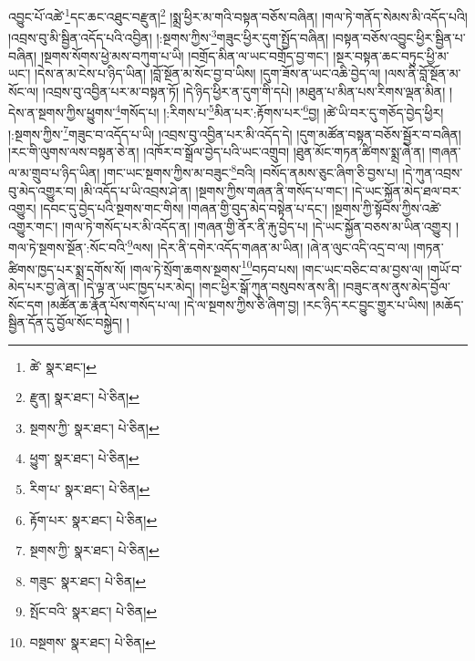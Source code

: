 འབྱུང་པོ་འཚེ་\footnote{ཚེ་  སྣར་ཐང་། }དང་ཆང་འཐུང་བརྫུན།\footnote{རྫུན།  སྣར་ཐང་།  པེ་ཅིན། } །སྨྲ་ཕྱིར་མ་གའི་བསྟན་བཅོས་བཞིན། །གལ་ཏེ་གནོད་སེམས་མི་འདོད་པའི། །འབྲས་བུ་མི་སྦྱིན་འདོད་པའི་འབྱིན། །:སྔགས་ཀྱིས་\footnote{སྔགས་ཀྱི་  སྣར་ཐང་།  པེ་ཅིན། }གཟུང་ཕྱིར་དུག་སྤྱོད་བཞིན། །བསྟན་བཅོས་འབྱུང་ཕྱིར་སྦྱིན་པ་བཞིན། །སྔགས་སོགས་ཕྱེ་མས་བཀུག་པ་ཡི། །བགྲོད་མིན་ལ་ཡང་བགྲོད་བྱ་གང་། །སྔར་བསྟན་ཆང་བཏུང་ཕྱི་མ་ཡང་། །དེས་ན་མ་ངེས་པ་ཉིད་ཡིན། །བློ་སྔོན་མ་སོང་བྱ་བ་ཡིས། །དུག་ཟོས་ན་ཡང་འཆི་བྱེད་ལ། །ལས་ནི་བློ་སྔོན་མ་སོང་ལ། །འབྲས་བུ་འབྱིན་པར་མ་བསྟན་ཏོ། །དེ་ཉིད་ཕྱིར་ན་དུག་གི་དཔེ། །མཐུན་པ་མིན་པས་རིགས་ལྡན་མིན། །དེས་ན་སྔགས་ཀྱིས་ཕྱུགས་\footnote{ཕྱུག་  སྣར་ཐང་།  པེ་ཅིན། }གསོད་པ། །:རིགས་པ་\footnote{རིག་པ་  སྣར་ཐང་།  པེ་ཅིན། }མིན་པར་:རྟོགས་པར་\footnote{རྟོག་པར་  སྣར་ཐང་།  པེ་ཅིན། }བྱ། །ཚེ་ཡི་བར་དུ་གཅོད་བྱེད་ཕྱིར། །:སྔགས་ཀྱིས་\footnote{སྔགས་ཀྱི་  སྣར་ཐང་།  པེ་ཅིན། }གཟུང་བ་འདོད་པ་ཡི། །འབྲས་བུ་འབྱིན་པར་མི་འདོད་དེ། །དུག་མཚོན་བསྟན་བཅོས་སྦྱོར་བ་བཞིན། །རང་གི་ལུགས་ལས་བསྟན་ཅེ་ན། །འཁོར་བ་སྒྲོལ་བྱེད་པའི་ཡང་འགྲུབ། །ཐུན་མོང་གཏན་ཚིགས་སྨྲ་ཞེ་ན། །གཞན་ལ་མ་གྲུབ་པ་ཉིད་ཡིན། །གང་ཡང་སྔགས་ཀྱིས་མ་བཟུང་\footnote{གཟུང་  སྣར་ཐང་།  པེ་ཅིན། }བའི། །བསོད་ནམས་ཅུང་ཞིག་ཅི་བྱས་པ། །དེ་ཀུན་འབྲས་བུ་མེད་འགྱུར་བ། །མི་འདོད་པ་ཡི་འབྲས་ཤེ་ན། །སྔགས་ཀྱིས་གཞན་ནི་གསོད་པ་གང་། །དེ་ཡང་སྐྱོན་མེད་ཐལ་བར་འགྱུར། །དབང་དུ་བྱེད་པའི་སྔགས་གང་གིས། །གཞན་གྱི་བུད་མེད་བསྟེན་པ་དང་། །སྔགས་ཀྱི་སྟོབས་ཀྱིས་འཚེ་འགྱུར་གང་། །གལ་ཏེ་གསོད་པར་མི་འདོད་ན། །གཞན་གྱི་ནོར་ནི་རྐུ་བྱེད་པ། །དེ་ཡང་སྐྱོན་བཅས་མ་ཡིན་འགྱུར། །གལ་ཏེ་སྔགས་སྔོན་:སོང་བའི་\footnote{སྤོང་བའི་  སྣར་ཐང་།  པེ་ཅིན། }ལས། །དེར་ནི་དགེར་འདོད་གཞན་མ་ཡིན། །ཞེ་ན་ལུང་འདི་འདྲ་བ་ལ། །གཏན་ཚིགས་ཁྱད་པར་སྨྲ་དགོས་སོ། །གལ་ཏེ་སྲོག་ཆགས་སྔགས་\footnote{བསྔགས་  སྣར་ཐང་།  པེ་ཅིན། }བཏབ་པས། །གང་ཡང་བཅིང་བ་མ་བྱས་ལ། །གཡོ་བ་མེད་པར་བྱ་ཞེ་ན། །དེ་ལྟ་ན་ཡང་ཁྱད་པར་མེད། །གང་ཕྱིར་སྒོ་ཀུན་བསུབས་ནས་ནི། །བཟུང་ནས་ནུས་མེད་བྱོལ་སོང་དག །མཚོན་ཆ་རྣོན་པོས་གསོད་པ་ལ། །དེ་ལ་སྔགས་ཀྱིས་ཅི་ཞིག་བྱ། །རང་ཉིད་རང་བྱུང་གྱུར་པ་ཡིས། །མཆོད་སྦྱིན་དོན་དུ་བྱོལ་སོང་བསྐྱེད། །
